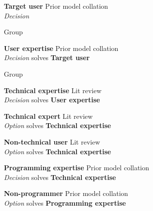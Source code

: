 
\textbf{Target user} \hfill Prior model collation \\ \emph{Decision} \hfill 

Group

\textbf{User expertise} \hfill Prior model collation \\ \emph{Decision} \hfill solves \textbf{Target user}

Group

\textbf{Technical expertise} \hfill Lit review \cite{Silva2008} \\ \emph{Decision} \hfill solves \textbf{User expertise}

\textbf{Technical expert} \hfill Lit review \cite{Silva2008,Pietschmann2010} \\ \emph{Option} \hfill solves \textbf{Technical expertise}

\textbf{Non-technical user} \hfill Lit review \cite{Silva2008,Pietschmann2010} \\ \emph{Option} \hfill solves \textbf{Technical expertise}

\textbf{Programming expertise} \hfill Prior model collation \cite{Aghaee2012,Patel2010} \\ \emph{Decision} \hfill solves \textbf{Technical expertise}

\textbf{Non-programmer} \hfill Prior model collation \cite{Aghaee2012,Patel2010,Pietschmann2010} \\ \emph{Option} \hfill solves \textbf{Programming expertise}


